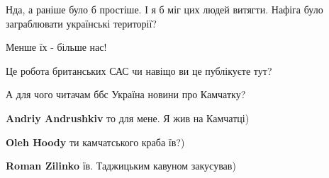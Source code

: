 \begin{itemize}
Нда, а раніше було б простіше. І я б міг цих людей витягти. Нафіга було заграблювати українські території?

 
Менше їх - більше нас!

 
Це робота британських САС чи навіщо ви це публікуєте тут?

 
А для чого читачам ббс Україна новини про Камчатку?

\begin{itemize}
 
\textbf{Andriy Andrushkiv} то для мене. Я жив на Камчатці)

\begin{itemize}
 
\textbf{Oleh Hoody} ти камчатського краба їв?)

 
\textbf{Roman Zilinko} їв. Таджицьким кавуном закусував)
\end{itemize}	


\end{itemize}
\end{itemize}

